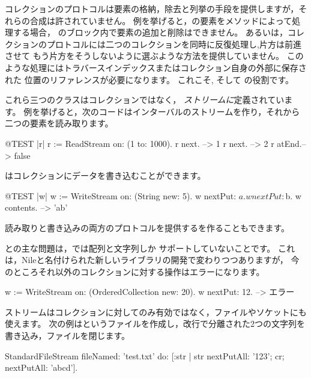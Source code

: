 \documentclass[a4paper,10pt,twoside]{book}
\begin{document}
コレクションのプロトコルは要素の格納，除去と列挙の手段を提供しますが，それらの合成は許されていません。
例を挙げると，の要素をメソッドによって処理する場合，
のブロック内で要素の追加と削除はできません。
あるいは，コレクションのプロトコルには二つのコレクションを同時に反復処理し,片方は前進させて
もう片方をそうしないように選ぶような方法を提供していません。
このような処理にはトラバースインデックスまたはコレクション自身の外部に保存された
位置のリファレンスが必要になります。
これこそ,   そして の役割です。



これら三つのクラスはコレクションではなく， \emph{ストリームに}定義されています。
例を挙げると，次のコードはインターバルのストリームを作り，それから二つの要素を読み取ります。


\begin{code}{@TEST |r|}
r := ReadStream on: (1 to: 1000).
r next.   --> 1
r next.   --> 2
r atEnd.--> false
\end{code}

はコレクションにデータを書き込むことができます。


\begin{code}{@TEST |w|}
w := WriteStream on: (String new: 5).
w nextPut: $a.
w nextPut: $b.
w contents. -->  'ab'
\end{code}

読み取りと書き込みの両方のプロトコルを提供するを作ることもできます。

との主な問題は，\pharo では配列と文字列しか
サポートしていないことです。
これは，Nileと名付けられた新しいライブラリの開発で変わりつつありますが，
今のところそれ以外のコレクションに対する操作はエラーになります。

\begin{code}{}
w := WriteStream on: (OrderedCollection new: 20).
w nextPut: 12. -->  エラー
\end{code}

ストリームはコレクションに対してのみ有効ではなく，ファイルやソケットにも使えます。
次の例はというファイルを作成し，改行で分離された2つの文字列を書き込み，ファイルを閉じます。

\begin{code}{}
StandardFileStream
  fileNamed: 'test.txt'
  do: [:str | str
                nextPutAll: '123';
                cr;
                nextPutAll: 'abcd'].
\end{code}
\end{document}
